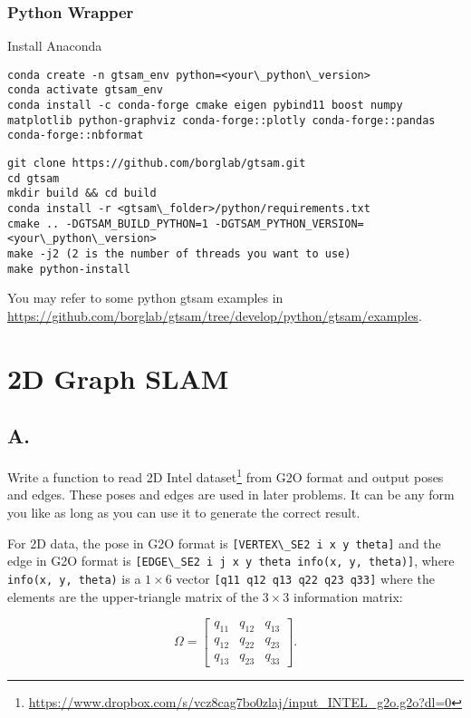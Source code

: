 \documentclass[tp]{lcc}
\begin{document}
\subsubsection{Python Wrapper}

Install Anaconda

\begin{lstlisting}[style=bash] 
conda create -n gtsam_env python=<your\_python\_version>
conda activate gtsam_env
conda install -c conda-forge cmake eigen pybind11 boost numpy matplotlib python-graphviz conda-forge::plotly conda-forge::pandas conda-forge::nbformat
\end{lstlisting}

\begin{lstlisting}[style=bash] 
git clone https://github.com/borglab/gtsam.git
cd gtsam
mkdir build && cd build
conda install -r <gtsam\_folder>/python/requirements.txt
cmake .. -DGTSAM_BUILD_PYTHON=1 -DGTSAM_PYTHON_VERSION=<your\_python\_version>
make -j2 (2 is the number of threads you want to use)
make python-install
\end{lstlisting}

You may refer to some python gtsam examples in \url{https://github.com/borglab/gtsam/tree/develop/python/gtsam/examples}.

\section{2D Graph SLAM}
\subsection{A.}
Write a function to read 2D Intel dataset\footnote{\url{https://www.dropbox.com/s/vcz8cag7bo0zlaj/input_INTEL_g2o.g2o?dl=0}} from G2O format and output poses and edges. These poses and edges are used in later problems. It can be any form you like as long as you can use it to generate the correct result.

For 2D data, the pose in G2O format is \lstinline[style=bash]{[VERTEX\_SE2 i x y theta]} and the edge in G2O format is \lstinline[style=bash]{[EDGE\_SE2 i j x y theta info(x, y, theta)]}, where \lstinline[style=bash]{info(x, y, theta)} is a $1 \times 6$ vector \lstinline[style=bash]{[q11 q12 q13 q22 q23 q33]} where the elements are the upper-triangle matrix of the $3 \times 3$ information matrix:

\begin{equation*}
    \Omega = \begin{bmatrix} q_{11} & q_{12} & q_{13} \\ q_{12} & q_{22} & q_{23} \\ q_{13} & q_{23} & q_{33} \end{bmatrix}.
\end{equation*}
\end{document}
